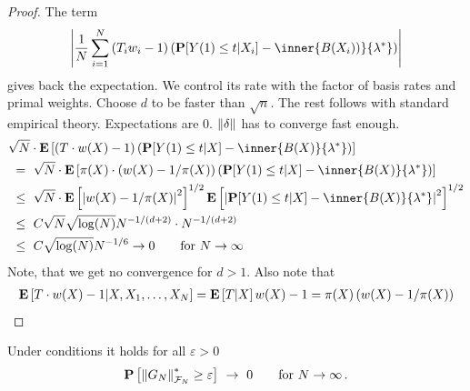 \begin{proof}
The term 
\begin{gather}
    \left|  
  \frac{1}{N}
    \sum_{i=1}^{N} 
    \left( 
    T_i
    w_i
    -
    1
    \right)
    \left( 
    \P[Y(1)\le t | X_i]
    -
    \inner
    {B(X_i))}
    {\lambda^*}
    \right)
  \right|
\end{gather}
gives back the expectation. We control its rate 
with the factor of basis rates and primal weights.
Choose $d$ to be faster than $\sqrt{n}$.
The rest follows with standard empirical theory.
Expectations are 0.
$\left\lVert\delta\right\rVert$ has to converge fast enough.
\begin{align*}
  &
  \sqrt{N}
  \cdot
  \E
  \left[ 
    \left( 
    T
    \cdot
    w(X)
    -
    1
    \right)
    \left( 
      \P
      [
      Y(1)\le t
      |X
      ]
      -
      \inner
      {B(X)}
      {\lambda^*}
    \right)
  \right]
  \\
  &
  \ 
  =
  \ 
  \sqrt{N}
  \cdot
  \E
  \left[ 
    \pi(X)
    \cdot
    \left( 
    w(X)
    -
    1
    /
    \pi(X)
    \right)
    \left( 
      \P
      [
      Y(1)\le t
      |X
      ]
      -
      \inner
      {B(X)}
      {\lambda^*}
    \right)
  \right]
  \\
  &
  \ 
  \le
  \ 
  \sqrt{N}
  \cdot
  \E
  \left[ 
    \left| 
    w(X)
    -
    1
    /
    \pi(X)
    \right|
    ^2
    \right]
    ^{1/2}
  \E
  \left[ 
    \left| 
      \P
      [
      Y(1)\le t
      |X
      ]
      -
      \inner
      {B(X)}
      {\lambda^*}
    \right|
    ^2
    \right]
    ^{1/2}
    \\
  &
  \ 
  \le
  \ 
  C
  \sqrt{N}
  \sqrt{\log(N)}
  N^{-1/(d+2)}
  \cdot
  N^{-1/(d+2)}
    \\
  &
  \ 
  \le
  \ 
  C
  \sqrt{\log(N)}
  N^{-1/6}
  \to 0
  \qquad
  \text{for}\ 
  N\to\infty
\end{align*}
Note, that we get no convergence for $d>1$. 
Also note that
\begin{gather*}
  \mathbf{E}
  \left[ 
    T
    \cdot
    w(X)
    -
    1
    |
    X,
    X_1,
    \ldots,
    X_N
    \right]
    =
  \mathbf{E}
  \left[ 
    T
    |
    X
    \right]
    w(X)
    -
    1
    =
    \pi(X)
    \left( 
      w(X)
      -
      1/\pi(X)
    \right)
\end{gather*}
\end{proof}
\begin{lemma}
  Under conditions it holds
  for all $\varepsilon>0$
  \begin{gather}
    \P
    \left[ 
      \norm{G_N}^*_{\mathcal{F}_N}\ge \varepsilon
    \right]
    \ 
    \to 
    \ 
    0
    \qquad
    \text{for}\ 
    N\to\infty
    \,.
  \end{gather}
\end{lemma}
